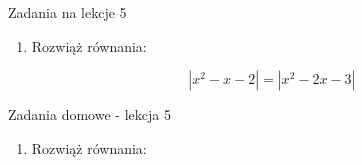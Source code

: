 \documentclass[12pt,a4paper]{article}
\begin{document}
	
	
	
	\begin{center}
		\LARGE Zadania na lekcje 5
	\end{center}
	\vspace{1.5cm}
	
	\begin{enumerate}[1.]
		\item Rozwiąż równania:

$$|x^2-x-2|=|x^2-2x-3|$$
		
	\end{enumerate}
	
	\newpage
	
	\begin{center}
		\LARGE Zadania domowe - lekcja 5
	\end{center}
	\vspace{1.5cm}
	
	\begin{enumerate}[1.]
		
		\item Rozwiąż równania: %
		

		
	\end{enumerate}
	
	
	
\end{document}
